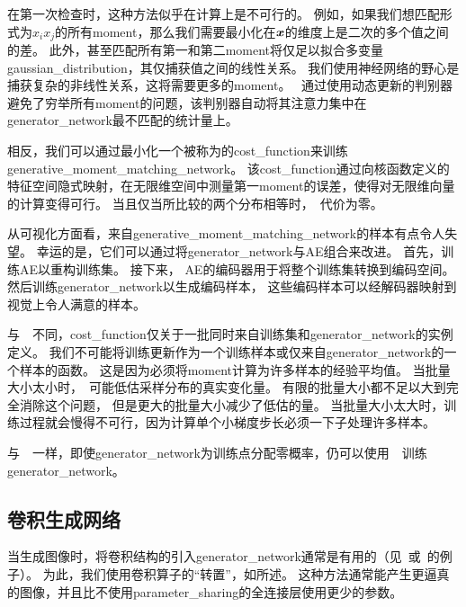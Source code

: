 在第一次检查时，这种方法似乎在计算上是不可行的。
例如，如果我们想匹配形式为$x_ix_j$的所有\gls{moment}，那么我们需要最小化在$\boldsymbol{\mathit{x}}$的维度上是二次的多个值之间的差。
此外，甚至匹配所有第一和第二\gls{moment}将仅足以拟合多变量\gls{gaussian_distribution}，其仅捕获值之间的线性关系。
我们使用神经网络的野心是捕获复杂的非线性关系，这将需要更多的\gls{moment}。
~通过使用动态更新的判别器避免了穷举所有\gls{moment}的问题，该判别器自动将其注意力集中在\gls{generator_network}最不匹配的统计量上。


相反，我们可以通过最小化一个被称为\citep{scholkopf2002learning,gretton2012kernel}的\gls{cost_function}来训练\gls{generative_moment_matching_network}。
该\gls{cost_function}通过向核函数定义的特征空间隐式映射，在无限维空间中测量第一\gls{moment}的误差，使得对无限维向量的计算变得可行。
当且仅当所比较的两个分布相等时，~代价为零。

从可视化方面看，来自\gls{generative_moment_matching_network}的样本有点令人失望。
幸运的是，它们可以通过将\gls{generator_network}与\gls{AE}组合来改进。
首先，训练\gls{AE}以重构训练集。
接下来， \gls{AE}的编码器用于将整个训练集转换到编码空间。
然后训练\gls{generator_network}以生成编码样本， 这些编码样本可以经解码器映射到视觉上令人满意的样本。

与~~不同，\gls{cost_function}仅关于一批同时来自训练集和\gls{generator_network}的实例定义。
我们不可能将训练更新作为一个训练样本或仅来自\gls{generator_network}的一个样本的函数。
这是因为必须将\gls{moment}计算为许多样本的经验平均值。
当批量大小太小时，~可能低估采样分布的真实变化量。
有限的批量大小都不足以大到完全消除这个问题， 但是更大的批量大小减少了低估的量。
当批量大小太大时，训练过程就会慢得不可行，因为计算单个小梯度步长必须一下子处理许多样本。

与~~一样，即使\gls{generator_network}为训练点分配零概率，仍可以使用~~训练\gls{generator_network}。


\subsection{卷积生成网络}
\label{sec:convolutional_generative_networks}
当生成图像时，将卷积结构的引入\gls{generator_network}通常是有用的（见~\citet{Goodfellow-et-al-NIPS2014-small}或~\citet{dosovitskiy2015learning}的例子）。
为此，我们使用卷积算子的``转置''，如所述。
这种方法通常能产生更逼真的图像，并且比不使用\gls{parameter_sharing}的全连接层使用更少的参数。


